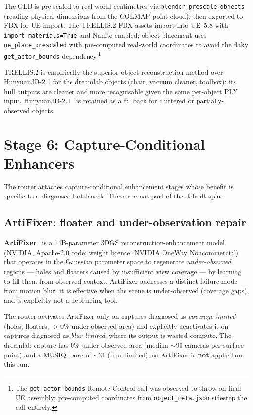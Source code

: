 The GLB is pre-scaled to real-world centimetres via \texttt{blender\_prescale\_objects}
(reading physical dimensions from the COLMAP point cloud), then exported to FBX for UE
import.  The TRELLIS.2 FBX assets import into UE~5.8 with \texttt{import\_materials=True}
and Nanite enabled; object placement uses \texttt{ue\_place\_prescaled} with
pre-computed real-world coordinates to avoid the flaky \texttt{get\_actor\_bounds}
dependency.\footnote{The \texttt{get\_actor\_bounds} Remote Control call was observed to throw on final UE assembly; pre-computed coordinates from \texttt{object\_meta.json} sidestep the call entirely.}

TRELLIS.2 is empirically the superior object reconstruction method over Hunyuan3D-2.1 for
the dreamlab objects (chair, vacuum cleaner, toolbox): its hull outputs are cleaner and
more recognisable given the same per-object PLY input.  Hunyuan3D-2.1~\cite{zhao2025_hunyuan3d20}
is retained as a fallback for cluttered or partially-observed objects.

\section{Stage 6: Capture-Conditional Enhancers}
\label{sec:method:enhancers}

The router attaches capture-conditional enhancement stages whose benefit is specific to
a diagnosed bottleneck.  These are not part of the default spine.

\subsection{ArtiFixer: floater and under-observation repair}
\label{sec:method:artifixer}
\textbf{ArtiFixer}~\cite{delutio2026_artifixer} is a 14B-parameter 3DGS reconstruction-enhancement
model (NVIDIA, Apache-2.0 code; weight licence: NVIDIA OneWay Noncommercial) that
operates in the Gaussian parameter space to regenerate \emph{under-observed} regions ---
holes and floaters caused by insufficient view coverage --- by learning to fill them from
observed context.  ArtiFixer addresses a distinct failure mode from motion blur: it is
effective when the scene is under-observed (coverage gaps), and is explicitly not a
deblurring tool.

The router activates ArtiFixer only on captures diagnosed as \emph{coverage-limited}
(holes, floaters, $>0\%$ under-observed area) and explicitly deactivates it on
captures diagnosed as \emph{blur-limited}, where its output is wasted compute.  The
dreamlab capture has 0\% under-observed area (median $\sim$90 cameras per surface point)
and a MUSIQ score of $\sim$31 (blur-limited), so ArtiFixer is \textbf{not} applied on
this run.

